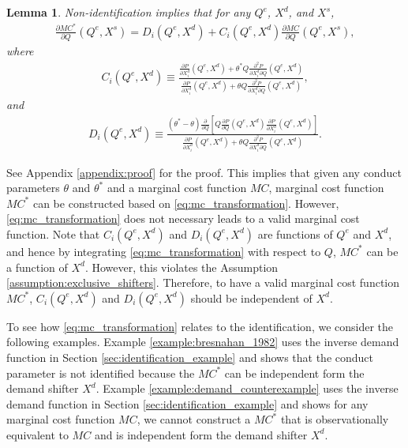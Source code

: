 \documentclass[11pt, a4paper]{article}
\newtheorem{lemma}{Lemma}
\theoremstyle{remark}
\begin{document}
\begin{lemma}\label{lemma:non-identification_transformation}
    Non-identification implies that for any $Q^e$, $X^{d}$, and $X^{s}$,
    \begin{align}
        \frac{\partial MC^{*}}{\partial Q}(Q^e, X^{s}) = D_i(Q^e, X^{d}) + C_i(Q^e, X^{d})\frac{\partial MC}{\partial Q}(Q^e, X^{s}), \label{eq:mc_transformation}
    \end{align}
    where
    \begin{align}
        C_i(Q^e, X^{d}) \equiv \frac{\frac{\partial P}{\partial X^{d}_i}(Q^e, X^{d}) + \theta^{*} Q\frac{\partial^2 P}{\partial X^{d}_{i}\partial Q}(Q^e, X^{d}) }{\frac{\partial P}{\partial X^{d}_i}(Q^e, X^{d}) + \theta Q\frac{\partial^2 P}{\partial X^{d}_{i}\partial Q}(Q^e, X^{d}) },\label{eq:ratio_marginal_revenue}
    \end{align}
    and
    \begin{align}
        D_i(Q^e, X^{d}) \equiv\frac{(\theta^{*} - \theta)\frac{\partial }{\partial Q}\left[Q\frac{\partial P}{\partial Q}(Q^e, X^{d}) \frac{\partial P}{\partial X^{d}_i}(Q^e, X^{d})\right]}{\frac{\partial P}{\partial X^{d}_i}(Q^e, X^{d}) + \theta Q\frac{\partial^2 P}{\partial X^{d}_{i}\partial Q}(Q^e, X^{d})}.\label{eq:intercation_derivative_demand}
    \end{align}
\end{lemma}
See Appendix \ref{appendix:proof} for the proof.
This implies that given any conduct parameters $\theta$ and $\theta^{*}$ and a marginal cost function $MC$, marginal cost function $MC^{*}$ can be constructed based on \eqref{eq:mc_transformation}.
However, \eqref{eq:mc_transformation} does not necessary leads to a valid marginal cost function.
Note that $C_i(Q^e, X^{d})$ and $D_i(Q^e, X^{d})$ are functions of $Q^e$ and $X^{d}$, and hence by integrating \eqref{eq:mc_transformation} with respect to $Q$, $MC^{*}$ can be a function of $X^{d}$.
However, this violates the Assumption \ref{assumption:exclusive_shifters}.
Therefore, to have a valid marginal cost function $MC^{*}$, $C_i(Q^e, X^{d})$ and $D_i(Q^e, X^{d})$ should be independent of $X^{d}$.

To see how \eqref{eq:mc_transformation} relates to the identification, we consider the following examples.
Example \ref{example:bresnahan_1982} uses the inverse demand function in Section \ref{sec:identification_example} and shows that the conduct parameter is not identified because the $MC^{*}$ can be independent form the demand shifter $X^{d}$.
Example \ref{example:demand_counterexample} uses the inverse demand function in Section \ref{sec:identification_example} and shows for any marginal cost function $MC$, we cannot construct a $MC^{*}$ that is observationally equivalent to $MC$ and is independent form the demand shifter $X^{d}$.
\end{document}
